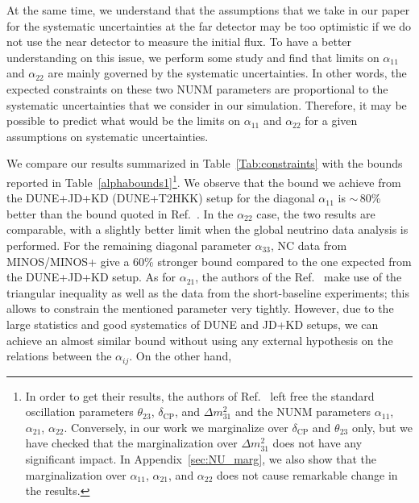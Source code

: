 \documentclass[11pt,a4paper]{article}
\newcommand{\aee}{\ensuremath{\alpha_{11}}}
\newcommand{\ame}{\ensuremath{\alpha_{21}}}
\newcommand{\amm}{\ensuremath{\alpha_{22}}}
\newcommand{\att}{\ensuremath{\alpha_{33}}}
\begin{document}
	At the same time, we understand that the assumptions that we take in our paper for the systematic uncertainties at the far detector may be too optimistic if we do not use the near detector to measure the initial flux.
		To have a better understanding on this issue, we perform some study and find that limits on $\alpha_{11}$ and $\alpha_{22}$ are mainly governed by the systematic uncertainties. In other words, the expected constraints on these two NUNM parameters are proportional to the systematic uncertainties that we consider in our simulation. Therefore, it may be possible to predict what would be the limits on $\alpha_{11}$ and $\alpha_{22}$ for a given assumptions on systematic uncertainties.

We compare our results summarized in Table~\ref{Tab:constraints} with the bounds reported in Table~\ref{alphabounds1}\footnote{In order to get their results, the authors of Ref.~\cite{Escrihuela:2016ube} left free the standard oscillation parameters $\theta_{23}$, $\delta_{\mathrm{CP}}$, and $\Delta m^2_{31}$ and the NUNM parameters $\aee$, $\ame$, $\amm$. Conversely, in our work we marginalize over $\delta_{\mathrm{CP}}$ and $\theta_{23}$ only, but we have checked that the marginalization over $\Delta m^2_{31}$ does not have any significant impact. In Appendix~\ref{sec:NU_marg}, we also show that the marginalization over $\aee$, $\ame$, and $\amm$ does not cause remarkable change in the results.}. We observe that the bound we achieve from the DUNE+JD+KD (DUNE+T2HKK) setup for the diagonal $\aee$ is $\sim$\,80\% better than the bound quoted in Ref.~\cite{Forero:2021azc}. In the $\amm$ case, the two results are comparable, with a slightly better limit when the global neutrino data analysis is performed. 
For the remaining diagonal parameter $\att$, NC data from MINOS/MINOS+ give a 60\% stronger bound \cite{Forero:2021azc}  compared to the one expected from the DUNE+JD+KD setup. As for $\ame$, the authors of the Ref.~\cite{Forero:2021azc} make use of the triangular inequality as well as the data from the short-baseline experiments; this allows to constrain the mentioned parameter very tightly. However, due to the large statistics and good systematics of DUNE and JD+KD setups, we can achieve an almost similar bound without using any external hypothesis on the relations between the $\alpha_{ij}$. On the other hand,
\end{document}
